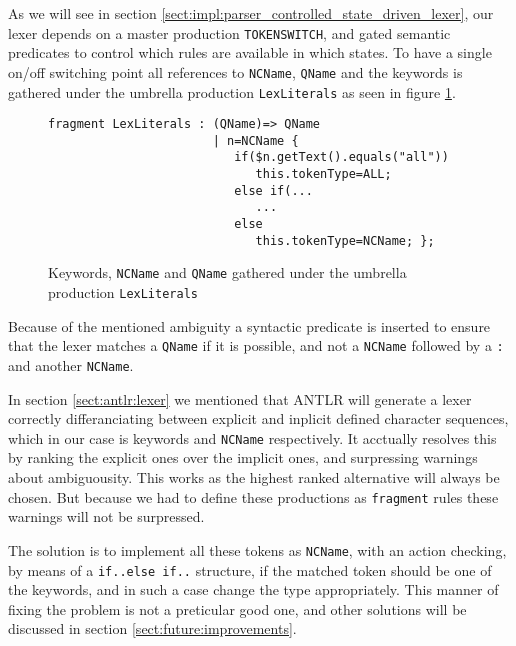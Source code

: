 As we will see in section \ref{sect:impl:parser_controlled_state_driven_lexer}, our lexer depends on a master production \verb!TOKENSWITCH!, and gated semantic predicates to control which rules are available in which states. To have a single on/off switching point all references to \verb!NCName!, \verb!QName! and the keywords is gathered under the umbrella production \verb!LexLiterals! as seen in figure \ref{fig:lexLitterals}.

\begin{figure}[h!]
\begin{verbatim}
fragment LexLiterals : (QName)=> QName
                       | n=NCName {
                          if($n.getText().equals("all")) 
                             this.tokenType=ALL;
                          else if(...
                             ...
                          else 
                             this.tokenType=NCName; };
\end{verbatim}
\caption[Keywords, \texttt{NCName} and \texttt{QName} gathered under \texttt{LexLiterals}]{Keywords, \texttt{NCName} and \texttt{QName} gathered under the umbrella production \texttt{LexLiterals}}
\label{fig:lexLitterals}
\end{figure}

Because of the mentioned ambiguity a syntactic predicate is inserted to ensure that the lexer matches a \verb!QName! if it is possible, and not a \verb!NCName! followed by a \verb!:! and another \verb!NCName!.

In section \ref{sect:antlr:lexer} we mentioned that ANTLR will generate a lexer correctly differanciating between explicit and inplicit defined character sequences, which in our case is keywords and \verb!NCName! respectively. It acctually resolves this by ranking the explicit ones over the implicit ones, and surpressing warnings about ambiguousity. This works as the highest ranked alternative will always be chosen. But because we had to define these productions as \verb!fragment! rules these warnings will not be surpressed.

The solution is to implement all these tokens as \verb!NCName!, with an action checking, by means of a \verb!if..else if..! structure, if the matched token should be one of the keywords, and in such a case change the type appropriately. This manner of fixing the problem is not a preticular good one, and other solutions will be discussed in section \ref{sect:future:improvements}.
